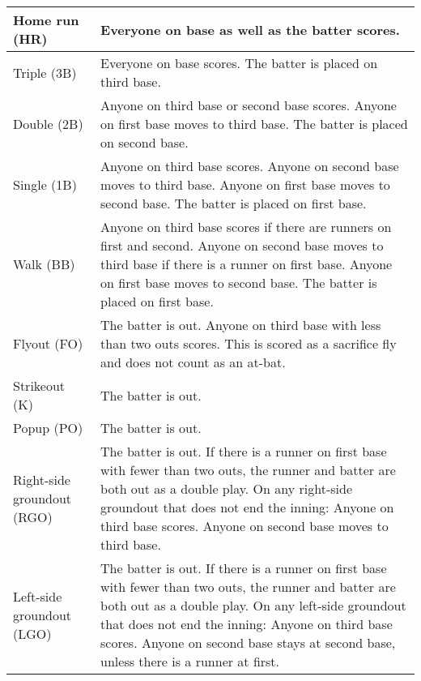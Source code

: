 \begin{deepEnumerate}
\begin{deepEnumerate}
\begin{center}
\begin{longtable}{|p{3cm}|p{8cm}|}
				Home run (HR)              & Everyone on base as well as the batter scores.                        \\
				\hline
				Triple (3B)                & Everyone on base scores.                                              
				The batter is placed on third base. \\
				\hline
				Double (2B)                & Anyone on third base or second base scores.                           
				Anyone on first base moves to third base.
				The batter is placed on second base. \\
				\hline
				Single (1B)                & Anyone on third base scores.                                          
				Anyone on second base moves to third base.
				Anyone on first base moves to second base.
				The batter is placed on first base. \\
				\hline
				Walk (BB)                  & Anyone on third base scores if there are runners on first and second. 
				Anyone on second base moves to third base if there is a runner on first base.
				Anyone on first base moves to second base.
				The batter is placed on first base. \\
				\hline 
				Flyout (FO)                & The batter is out.                                                    
				Anyone on third base with less than two outs scores. 
				This is scored as a sacrifice fly and does not count as an at-bat. \\
				\hline
				Strikeout (K)              & The batter is out.                                                    \\
				\hline
				Popup (PO)                 & The batter is out.                                                    \\
				\hline
				Right-side groundout (RGO) & The batter is out.                                                    
				If there is a runner on first base with fewer than two outs, the runner and batter are both out as a double play.
				On any right-side groundout that does not end the inning:
				Anyone on third base scores.
				Anyone on second base moves to third base. \\
				\hline
				Left-side groundout (LGO)  & The batter is out.                                                    
				If there is a runner on first base with fewer than two outs, the runner and batter are both out as a double play.
				On any left-side groundout that does not end the inning:
				Anyone on third base scores.
				Anyone on second base stays at second base, unless there is a runner at first. \\

\end{longtable}
\end{center}
\end{deepEnumerate}
\end{deepEnumerate}
